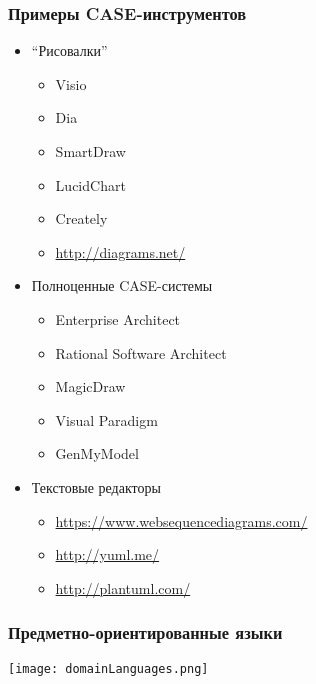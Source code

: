 \documentclass{../../slides-style}
\begin{document}
    \begin{frame}
        \frametitle{Примеры CASE-инструментов}
        \begin{itemize}
            \item ``Рисовалки''
            \begin{itemize}
                \item Visio
                \item Dia
                \item SmartDraw
                \item LucidChart
                \item Creately
                \item \url{http://diagrams.net/}
            \end{itemize}
            \item Полноценные CASE-системы
            \begin{itemize}
                \item Enterprise Architect
                \item Rational Software Architect
                \item MagicDraw
                \item Visual Paradigm
                \item GenMyModel
            \end{itemize}
            \item Текстовые редакторы
            \begin{itemize}
                \item \url{https://www.websequencediagrams.com/}
                \item \url{http://yuml.me/}
                \item \url{http://plantuml.com/}
            \end{itemize}
        \end{itemize}
    \end{frame}

    \begin{frame}
        \frametitle{Предметно-ориентированные языки}
        \begin{center}
            \texttt{[image: domainLanguages.png]}
        \end{center}
    \end{frame}
\end{document}
